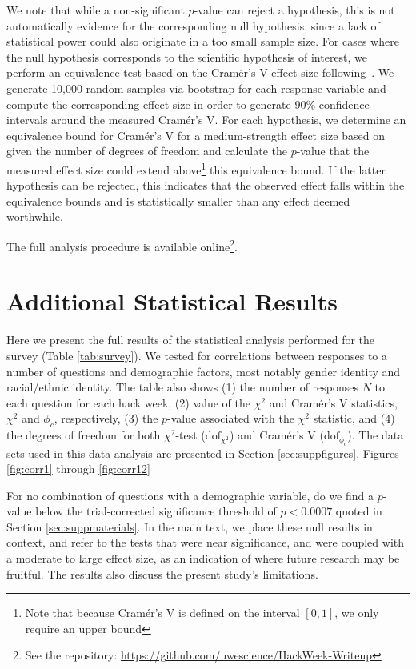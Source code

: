 \documentclass{aastex62}
\begin{document}
We note that while a non-significant $p$-value can reject a hypothesis, this is not automatically evidence for the corresponding null hypothesis, since a lack of statistical power could also originate in a too small sample size. For cases where the null hypothesis corresponds to the scientific hypothesis of interest, we perform an equivalence test based on the Cram\'{e}r's V effect size following~\citep{}. We generate 10,000 random samples via bootstrap for each response variable and compute the corresponding effect size in order to generate 90\% confidence intervals around the measured Cram\'{e}r's V. For each hypothesis, we determine an equivalence bound for Cram\'{e}r's V for a medium-strength effect size based on \citet{cohen1988} given the number of degrees of freedom and calculate the $p$-value that the measured effect size could extend above\footnote{Note that because Cram\'{e}r's V is defined on the interval $[0,1]$, we only require an upper bound} this equivalence bound. If the latter hypothesis can be rejected, this indicates that the observed effect falls within the equivalence bounds and is statistically smaller than any effect deemed worthwhile. 

The full analysis procedure is available online\footnote{See the repository: \url{https://github.com/uwescience/HackWeek-Writeup}}.

\section{Additional Statistical Results}

Here we present the full results of the statistical analysis performed for the survey (Table \ref{tab:survey}). We tested for correlations between responses to a number of questions and demographic factors, most notably gender identity and racial/ethnic identity. The table also shows (1) the number of responses $N$ to each question for each hack week, (2) value of the $\chi^2$ and Cram\'{e}r's V statistics, $\chi^2$ and $\phi_c$, respectively, (3) the $p$-value associated with the $\chi^2$ statistic, and (4) the degrees of freedom for both $\chi^2$-test ($\mathrm{dof}_{\chi^2}$) and Cram\'{e}r's V ($\mathrm{dof}_{\phi_c}$). The data sets used in this data analysis are presented in Section \ref{sec:suppfigures}, Figures \ref{fig:corr1} through \ref{fig:corr12}

For no combination of questions with a demographic variable, do we ﬁnd a $p$-value below the trial-corrected signiﬁcance threshold of $p < 0.0007$ quoted in Section \ref{sec:suppmaterials}. In the main text, we place these null results in context, and refer to the tests that were near significance, and were coupled with a moderate to large effect size, as an indication of where future research may be fruitful. The results also discuss the present study's limitations.
\end{document}
